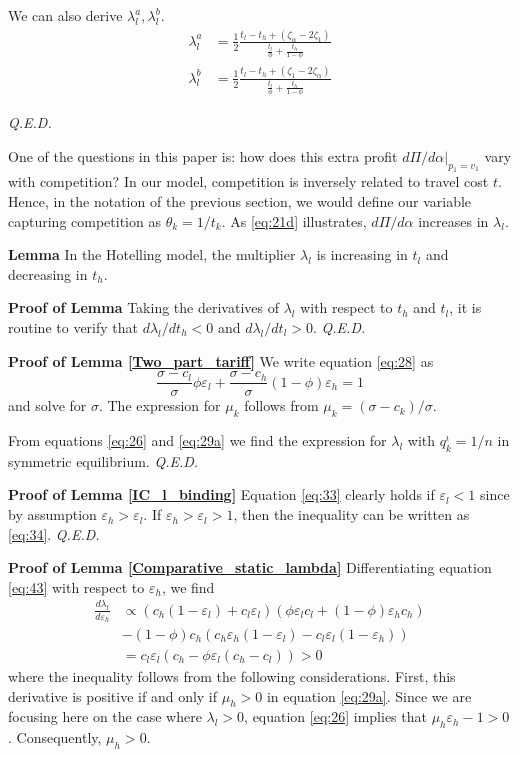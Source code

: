 \documentclass[a4paper,12pt]{article}
\newcommand{\qed}{\hspace*{\fill} {\em Q.E.D.}}
\begin{document}
We can also derive \(\lambda_{l}^a,\lambda_{l}^b\).
\begin{align}
\label{eq:48}
\lambda_{l}^a &= \frac{1}{2} \frac{t_l - t_h + (\zeta_{\alpha} - 2\zeta_1)}{\frac{t_l}{\phi}+\frac{t_h}{1-\phi}} \\
\label{eq:48b}
\lambda_{l}^b &= \frac{1}{2} \frac{t_l - t_h + (\zeta_{1} - 2\zeta_{\alpha})}{\frac{t_l}{\phi}+\frac{t_h}{1-\phi}}
\end{align}

 \qed

One of the questions in this paper is: how does this extra profit \(d\Pi/d\alpha|_{p_1=v_1}\) vary with competition? In our model, competition is inversely related to travel cost \(t\). Hence, in the notation of the previous section, we would define our variable capturing competition as \(\theta_k = 1/t_k\). As \eqref{eq:21d} illustrates, \(d\Pi/d\alpha\) increases in \(\lambda_l\).

\textbf{Lemma}
In the Hotelling model, the multiplier \(\lambda_l\) is increasing in \(t_l\) and decreasing in \(t_h\).

\textbf{Proof of Lemma}
Taking the derivatives of \(\lambda_l\) with respect to \(t_h\) and \(t_l\), it is routine to verify that \(d\lambda_l/d t_h <0\) and \(d\lambda_l/dt_l > 0\). 
 \qed

\textbf{Proof of Lemma \ref{Two_part_tariff}}
We write equation \eqref{eq:28} as
\begin{equation}
\label{eq:31}
\frac{\sigma-c_l}{\sigma}\phi \varepsilon_l+\frac{\sigma-c_h}{\sigma}(1-\phi) \varepsilon_h = 1
\end{equation}
and solve for \(\sigma\). The expression for \(\mu_k\) follows from \(\mu_k=(\sigma-c_k)/\sigma\).

From equations \eqref{eq:26} and \eqref{eq:29a} we find the expression for \(\lambda_l\) with \(q_k^{\iota}=1/n\) in symmetric equilibrium. 
 \qed


\textbf{Proof of Lemma \ref{IC_l_binding}}
Equation \eqref{eq:33} clearly holds if \(\varepsilon_l < 1\) since by assumption \(\varepsilon_h > \varepsilon_l\).
If \(\varepsilon_{h} > \varepsilon_l > 1\), then the inequality can be written as \eqref{eq:34}. 
 \qed

\textbf{Proof of Lemma \ref{Comparative_static_lambda}}
Differentiating equation \eqref{eq:43} with respect to \(\varepsilon_h\), we find
\begin{align*}
\frac{d \lambda_l}{d \varepsilon_h} &\propto (c_h (1-\varepsilon_l)+c_l \varepsilon_l) (\phi \varepsilon_l c_l + (1-\phi) \varepsilon_hc_h)\\
  & - (1-\phi) c_h (c_h \varepsilon_h (1-\varepsilon_l) - c_l \varepsilon_l(1-\varepsilon_h)) \\
 &= c_l \varepsilon_l (c_h - \phi \varepsilon_l (c_h-c_l)) > 0
\end{align*}
where the inequality follows from the following considerations. First, this derivative is positive if and only if \(\mu_h >0\) in equation \eqref{eq:29a}. Since we are focusing here on the case where \(\lambda_l >0\), equation \eqref{eq:26} implies that \(\mu_h \varepsilon_h - 1>0\). Consequently, \(\mu_h >0\).
\end{document}
